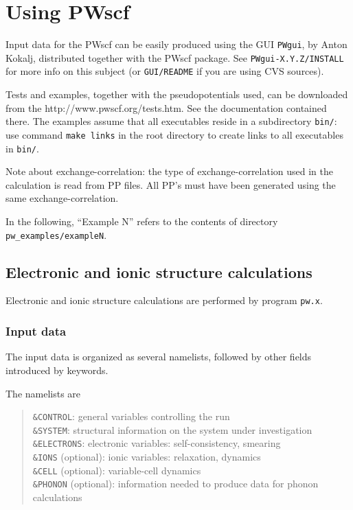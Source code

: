 \documentclass[12pt]{article}
\begin{document}
\newpage

\section{Using PWscf}

Input data for the PWscf can be easily produced using the GUI
{\tt PWgui}, by Anton Kokalj, distributed together with the PWscf
package. See {\tt PWgui-X.Y.Z/INSTALL} for more info on this subject
(or {\tt GUI/README} if you are using CVS sources).

Tests and examples, together with the pseudopotentials used, can be
downloaded from the 
{http://www.pwscf.org/tests.htm}.  See the documentation contained
there. The examples assume that all executables reside in a subdirectory
{\tt bin/}: use command {\tt make links} in the root directory to create
links to all executables in {\tt bin/}.

Note about exchange-correlation: the type of exchange-correlation
used in the calculation is read from PP files. All PP's must have 
been generated using the same exchange-correlation. 

In the following, ``Example N'' refers to the contents of 
directory {\tt pw\_examples/exampleN}.

\subsection{Electronic and ionic structure calculations}

Electronic and ionic structure calculations are performed by program
{\tt pw.x}.

\subsubsection{Input data}

The input data is organized as several namelists, followed by other
fields introduced by keywords.

The namelists are 
\begin{quote}
{\tt \&CONTROL}: general variables controlling the run\\
{\tt \&SYSTEM}:  structural information on the system under investigation\\
{\tt \&ELECTRONS}: electronic variables: self-consistency, smearing\\
{\tt \&IONS} (optional):  ionic variables: relaxation, dynamics\\
{\tt \&CELL} (optional): variable-cell dynamics\\
{\tt \&PHONON} (optional): information needed to produce data for
phonon calculations
\end{quote}
\end{document}
